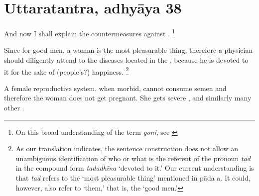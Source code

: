 
\section{Uttaratantra, adhyāya 38}

\begin{translation}

\item [1] And now I shall explain the countermeasures against .%
	\footnote{%
	On this broad understanding of the term \emph{yoni}, see \cite[pp.\ 
	572--5]{das-orig}}

\item [2] Since for good men, a woman is the most pleasurable thing, therefore a physician should diligently attend to the diseases located in the , because he is devoted to it for the sake of (people's?) happiness.%
	\footnote{%
	As our translation indicates, the sentence construction does not allow an 
	unambiguous identification of who or what is the referent of the pronoun 
	\textit{tad} in the compound form \emph{tadadhīna} ‘devoted to it.’ Our 
	current understanding is that \emph{tad} refers to the ‘most pleasurable thing’ 
	mentioned in pāda a. It could, however, also refer to ‘them,’ that is, the ‘good 
	men.’%
	}

\item [3] A female reproductive system, when morbid, cannot consume semen 
and therefore the woman does not get pregnant. She gets severe 
,  and similarly many other 
\se{roga}{diseases}.


\end{translation}
